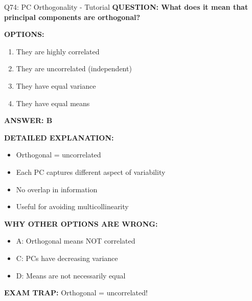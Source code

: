 \documentclass[8pt]{beamer}
\begin{document}
	\begin{frame}{Q74: PC Orthogonality - Tutorial}
		\fontsize{6.5}{7.5}\selectfont
		\textbf{QUESTION: What does it mean that principal components are orthogonal?}
		
		\vspace{0.1cm}
		\textbf{OPTIONS:}
		\begin{enumerate}
			\item They are highly correlated
			\item They are uncorrelated (independent)
			\item They have equal variance
			\item They have equal means
		\end{enumerate}
		
		\vspace{0.1cm}
		\textcolor{myblue}{\textbf{ANSWER: B}}
		
		\vspace{0.1cm}
		\textbf{DETAILED EXPLANATION:}
		\begin{itemize}
			\item Orthogonal = uncorrelated
			\item Each PC captures different aspect of variability
			\item No overlap in information
			\item Useful for avoiding multicollinearity
		\end{itemize}
		
		\vspace{0.1cm}
		\textcolor{myred}{\textbf{WHY OTHER OPTIONS ARE WRONG:}}
		\begin{itemize}
			\item \textcolor{myred}{A:} Orthogonal means NOT correlated
			\item \textcolor{myred}{C:} PCs have decreasing variance
			\item \textcolor{myred}{D:} Means are not necessarily equal
		\end{itemize}
		
		\textcolor{myred}{\textbf{EXAM TRAP:}} Orthogonal = \textcolor{myblue}{uncorrelated}!
	\end{frame}
	
\end{document}

